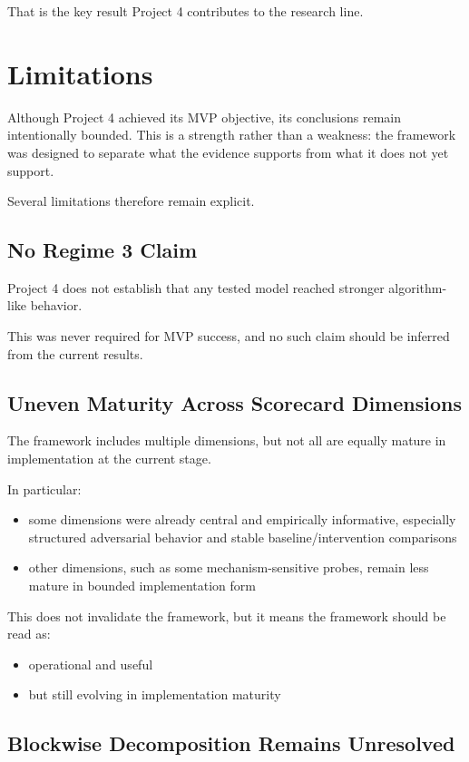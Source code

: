 \documentclass[11pt]{article}
\begin{document}
That is the key result Project 4 contributes to the research line.

\section{Limitations}

Although Project 4 achieved its MVP objective, its conclusions remain intentionally bounded. This is a strength rather than a weakness: the framework was designed to separate what the evidence supports from what it does not yet support.

Several limitations therefore remain explicit.

\subsection{No Regime 3 Claim}

Project 4 does not establish that any tested model reached stronger algorithm-like behavior.

This was never required for MVP success, and no such claim should be inferred from the current results.

\subsection{Uneven Maturity Across Scorecard Dimensions}

The framework includes multiple dimensions, but not all are equally mature in implementation at the current stage.

In particular:
\begin{itemize}[leftmargin=1.5em]
    \item some dimensions were already central and empirically informative, especially structured adversarial behavior and stable baseline/intervention comparisons
    \item other dimensions, such as some mechanism-sensitive probes, remain less mature in bounded implementation form
\end{itemize}

This does not invalidate the framework, but it means the framework should be read as:
\begin{itemize}[leftmargin=1.5em]
    \item operational and useful
    \item but still evolving in implementation maturity
\end{itemize}

\subsection{Blockwise Decomposition Remains Unresolved}
\end{document}
